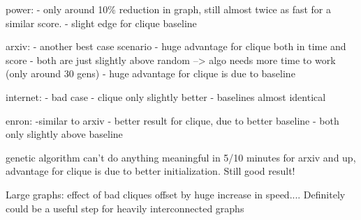 power:
- only around 10\% reduction in graph, still almost twice as fast for a similar score.
- slight edge for clique baseline

arxiv:
- another best case scenario
- huge advantage for clique both in time and score
- both are just slightly above random --> algo needs more time to work (only around 30 gens)
- huge advantage for clique is due to baseline

internet:
- bad case
- clique only slightly better
- baselines almost identical

enron:
-similar to arxiv
- better result for clique, due to better baseline
- both only slightly above baseline

genetic algorithm can't do anything meaningful in 5/10 minutes for arxiv and up, advantage for clique is due to better initialization. Still good result!

Large graphs: effect of bad cliques offset by huge increase in speed.... Definitely could be a useful step for heavily interconnected graphs
